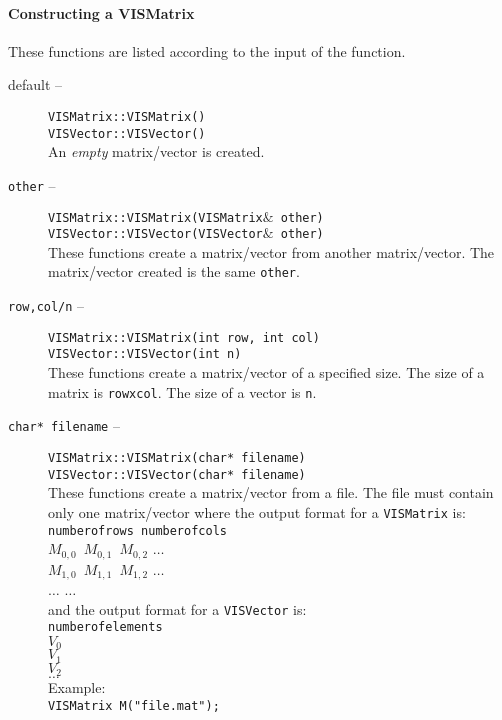 \paragraph{Constructing a VISMatrix}
These functions are listed according to the input of the function.
\begin{description}
\item[default --]
{\tt VISMatrix::VISMatrix()}\\
{\tt VISVector::VISVector()}\\
An {\em empty} matrix/vector is created.
\item[{\tt other} --]
{\tt VISMatrix::VISMatrix(VISMatrix$\&$ other)}\\
{\tt VISVector::VISVector(VISVector$\&$ other)}\\
These functions create a matrix/vector from another matrix/vector.
The matrix/vector created is the same {\tt other}.
\item[{\tt row,col/n} --]
{\tt VISMatrix::VISMatrix(int row, int col)}\\
{\tt VISVector::VISVector(int n)}\\
These functions create a matrix/vector of a specified size.
The size of a matrix is {\tt rowxcol}.  The size of 
a vector is {\tt n}.

\item[{\tt char* filename} --]
{\tt VISMatrix::VISMatrix(char* filename)}\\
{\tt VISVector::VISVector(char* filename)}\\
These functions create a matrix/vector from a file.
The file must contain only one matrix/vector where
the output format for a {\tt VISMatrix} is:\\
{\tt numberofrows numberofcols}\\
{\tt $M_{0,0}$ $M_{0,1}$ $M_{0,2}$} $\dots$\\
{\tt $M_{1,0}$ $M_{1,1}$ $M_{1,2}$} $\dots$\\
{\tt $\dots$} \hspace{0.25in} {\tt $\dots$}\\
\vspace*{0.25in}
and the output format for a {\tt VISVector} is:\\
{\tt numberofelements}\\
{\tt $V_0$}\\
{\tt $V_1$}\\
{\tt $V_2$}\\
{\tt $\dots$}\\
\vspace*{0.25in}
Example:\\ 
{\tt VISMatrix M("file.mat");}\\
\end{description}

